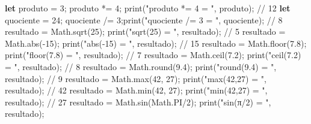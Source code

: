 \documentclass[
  portuguese,
  letterpaper,
  DIV=11,
  numbers=noendperiod]{scrreprt}
\newenvironment{Shaded}{\begin{snugshade}}{\end{snugshade}}
\newcommand{\BuiltInTok}[1]{\textcolor[rgb]{0.00,0.23,0.31}{#1}}
\newcommand{\CommentTok}[1]{\textcolor[rgb]{0.37,0.37,0.37}{#1}}
\newcommand{\ConstantTok}[1]{\textcolor[rgb]{0.56,0.35,0.01}{#1}}
\newcommand{\DecValTok}[1]{\textcolor[rgb]{0.68,0.00,0.00}{#1}}
\newcommand{\FloatTok}[1]{\textcolor[rgb]{0.68,0.00,0.00}{#1}}
\newcommand{\FunctionTok}[1]{\textcolor[rgb]{0.28,0.35,0.67}{#1}}
\newcommand{\KeywordTok}[1]{\textcolor[rgb]{0.00,0.23,0.31}{\textbf{#1}}}
\newcommand{\NormalTok}[1]{\textcolor[rgb]{0.00,0.23,0.31}{#1}}
\newcommand{\OperatorTok}[1]{\textcolor[rgb]{0.37,0.37,0.37}{#1}}
\newcommand{\StringTok}[1]{\textcolor[rgb]{0.13,0.47,0.30}{#1}}
\begin{document}
\begin{Shaded}
\begin{Highlighting}[]
\KeywordTok{let}\NormalTok{ produto }\OperatorTok{=} \DecValTok{3}\OperatorTok{;}\NormalTok{ produto }\OperatorTok{*=} \DecValTok{4}\OperatorTok{;}     \FunctionTok{print}\NormalTok{(}\StringTok{"produto *= 4 = "}\OperatorTok{,}\NormalTok{ produto)}\OperatorTok{;}       \CommentTok{// 12}
\KeywordTok{let}\NormalTok{ quociente }\OperatorTok{=} \DecValTok{24}\OperatorTok{;}\NormalTok{ quociente }\OperatorTok{/=} \DecValTok{3}\OperatorTok{;}\FunctionTok{print}\NormalTok{(}\StringTok{"quociente /= 3 = "}\OperatorTok{,}\NormalTok{ quociente)}\OperatorTok{;}   \CommentTok{// 8}
\NormalTok{resultado }\OperatorTok{=} \BuiltInTok{Math}\OperatorTok{.}\FunctionTok{sqrt}\NormalTok{(}\DecValTok{25}\NormalTok{)}\OperatorTok{;}         \FunctionTok{print}\NormalTok{(}\StringTok{"sqrt(25) = "}\OperatorTok{,}\NormalTok{ resultado)}\OperatorTok{;}         \CommentTok{// 5}
\NormalTok{resultado }\OperatorTok{=} \BuiltInTok{Math}\OperatorTok{.}\FunctionTok{abs}\NormalTok{(}\OperatorTok{{-}}\DecValTok{15}\NormalTok{)}\OperatorTok{;}         \FunctionTok{print}\NormalTok{(}\StringTok{"abs({-}15) = "}\OperatorTok{,}\NormalTok{ resultado)}\OperatorTok{;}         \CommentTok{// 15}
\NormalTok{resultado }\OperatorTok{=} \BuiltInTok{Math}\OperatorTok{.}\FunctionTok{floor}\NormalTok{(}\FloatTok{7.8}\NormalTok{)}\OperatorTok{;}       \FunctionTok{print}\NormalTok{(}\StringTok{"floor(7.8) = "}\OperatorTok{,}\NormalTok{ resultado)}\OperatorTok{;}       \CommentTok{// 7}
\NormalTok{resultado }\OperatorTok{=} \BuiltInTok{Math}\OperatorTok{.}\FunctionTok{ceil}\NormalTok{(}\FloatTok{7.2}\NormalTok{)}\OperatorTok{;}        \FunctionTok{print}\NormalTok{(}\StringTok{"ceil(7.2) = "}\OperatorTok{,}\NormalTok{ resultado)}\OperatorTok{;}        \CommentTok{// 8}
\NormalTok{resultado }\OperatorTok{=} \BuiltInTok{Math}\OperatorTok{.}\FunctionTok{round}\NormalTok{(}\FloatTok{9.4}\NormalTok{)}\OperatorTok{;}       \FunctionTok{print}\NormalTok{(}\StringTok{"round(9.4) = "}\OperatorTok{,}\NormalTok{ resultado)}\OperatorTok{;}       \CommentTok{// 9}
\NormalTok{resultado }\OperatorTok{=} \BuiltInTok{Math}\OperatorTok{.}\FunctionTok{max}\NormalTok{(}\DecValTok{42}\OperatorTok{,} \DecValTok{27}\NormalTok{)}\OperatorTok{;}      \FunctionTok{print}\NormalTok{(}\StringTok{"max(42,27) = "}\OperatorTok{,}\NormalTok{ resultado)}\OperatorTok{;}       \CommentTok{// 42}
\NormalTok{resultado }\OperatorTok{=} \BuiltInTok{Math}\OperatorTok{.}\FunctionTok{min}\NormalTok{(}\DecValTok{42}\OperatorTok{,} \DecValTok{27}\NormalTok{)}\OperatorTok{;}      \FunctionTok{print}\NormalTok{(}\StringTok{"min(42,27) = "}\OperatorTok{,}\NormalTok{ resultado)}\OperatorTok{;}       \CommentTok{// 27}
\NormalTok{resultado }\OperatorTok{=} \BuiltInTok{Math}\OperatorTok{.}\FunctionTok{sin}\NormalTok{(}\BuiltInTok{Math}\OperatorTok{.}\ConstantTok{PI}\OperatorTok{/}\DecValTok{2}\NormalTok{)}\OperatorTok{;}   \FunctionTok{print}\NormalTok{(}\StringTok{"sin(π/2) = "}\OperatorTok{,}\NormalTok{ resultado)}\OperatorTok{;} 
\end{Highlighting}
\end{Shaded}
\end{document}

